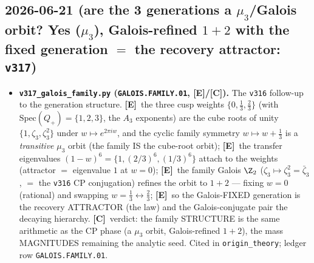 \documentclass[11pt]{article}
\providecommand{\mE}{\textbf{[E]}}\providecommand{\mC}{\textbf{[C]}}
\begin{document}
\subsection*{2026-06-21 (are the 3 generations a $\mu_3$/Galois orbit? Yes ($\mu_3$), Galois-refined $1{+}2$ with the fixed generation $=$ the recovery attractor: \texttt{v317})}
\begin{itemize}
\item \textbf{\texttt{v317\_galois\_family.py} (\texttt{GALOIS.FAMILY.01}, \mE/\mC).} The \texttt{v316} follow-up to the
  generation structure. \mE\ the three cusp weights $\{0,\tfrac13,\tfrac23\}$ (with $\mathrm{Spec}(Q_+)=\{1,2,3\}$,
  the $A_3$ exponents) are the cube roots of unity $\{1,\zeta_3,\zeta_3^2\}$ under $w\mapsto e^{2\pi i w}$, and the
  cyclic family symmetry $w\mapsto w{+}\tfrac13$ is a \emph{transitive} $\mu_3$ orbit (the family IS the cube-root
  orbit); \mE\ the transfer eigenvalues $(1{-}w)^6=\{1,(2/3)^6,(1/3)^6\}$ attach to the weights (attractor $=$
  eigenvalue $1$ at $w{=}0$); \mE\ the family Galois $\Z_2$ ($\zeta_3\mapsto\zeta_3^2=\bar\zeta_3$, $=$ the
  \texttt{v316} CP conjugation) refines the orbit to $1{+}2$ --- fixing $w{=}0$ (rational) and swapping
  $w{=}\tfrac13\leftrightarrow\tfrac23$; \mE\ so the Galois-FIXED generation is the recovery ATTRACTOR (the law) and
  the Galois-conjugate pair the decaying hierarchy. \mC\ verdict: the family STRUCTURE is the same arithmetic as the
  CP phase (a $\mu_3$ orbit, Galois-refined $1{+}2$), the mass MAGNITUDES remaining the analytic seed. Cited in
  \texttt{origin\_theory}; ledger row \texttt{GALOIS.FAMILY.01}.
\end{itemize}
\end{document}
